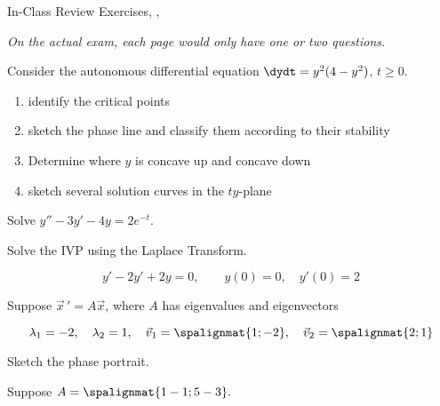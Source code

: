 \documentclass[12pt]{exam}
\newcommand{\TestName}{In-Class Review Exercises}
\begin{document}
    

\begin{center}
{\Large \TestName, \Course, \Semester \ \Year}
\end{center}    

\textit{On the actual exam, each page would only have one or two questions.} 


    
\begin{questions}

    \question Consider the autonomous differential equation $\dydt = y^2 (4 - y^2)$, $t \ge 0$.
    \begin{enumerate}[label=(\roman*)]
        \item identify the critical points
        \item sketch the phase line and classify them according to their stability
        \item Determine where $y$ is concave up and concave down
        \item sketch several solution curves in the $ty$-plane
    \end{enumerate}
    
    


    \question Solve $y'' - 3y' - 4y = 2e^{-t}$.
    


 	
    \question Solve the IVP using the Laplace Transform.
    
    $$y' -2y' +2 y = 0,  \qquad y(0) = 0, \quad y'(0) = 2$$

    

    \question Suppose $\vec x \, ' = A \vec x$, where $A$ has eigenvalues and eigenvectors
    
    $$\lambda_1 = -2, \quad \lambda_2 = 1, \quad \vec v_1=\spalignmat{1;-2}, \quad \vec v_2 = \spalignmat{2;1}$$
   
    Sketch the phase portrait.
    
    \question Suppose $A =\spalignmat{1 -1;5 -3}.$  %
 	

\end{questions}
\end{document}
